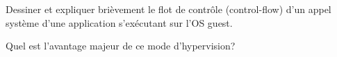 \begin{questions}
\begin{parts}
\begin{subparts}
\begin{subsubparts}
        \subsubpart[2] Dessiner et expliquer brièvement le flot de contrôle (control-flow) d'un appel système d'une application s'exécutant sur l'OS guest.

        \subsubpart[1] Quel est l'avantage majeur de ce mode d'hypervision?

      \end{subsubparts}
  \end{subparts}

\end{parts}

\end{questions}

%
%
\gradingtable


